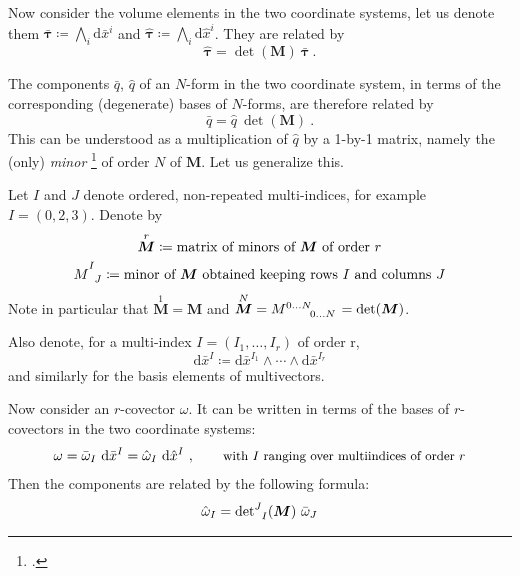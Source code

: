 \documentclass[\ifafour a4paper,12pt,\else a5paper,10pt,\fi%
onecolumn,oneside,article,%
british%
]{memoir}
\theoremstyle{remark}
\theoremstyle{innote}
\newcommand*{\citep}{\footcites}
\newcommand*{\di}{\mathrm{d}}%
\newcommand*{\defd}{\coloneqq}
\renewcommand*{\|}[1][]{\nonscript\:#1\vert\nonscript\:\mathopen{}}
\newcommand*{\sect}{\S}%
\newcommand*{\hx}{\hat{x}}
\newcommand*{\lx}{\bar{x}}
\renewcommand*{\i}{\indices}
\newcommand*{\mino}[2][]{\overset{#1}{#2}}
\begin{document}
Now consider the volume elements in the two coordinate systems, let us
denote them $\bar{\bm{\tau}} \defd \bigwedge_{i} \di \lx^{i}$ and $\hat{\bm{\tau}}
\defd \bigwedge_{i} \di \hx^{i}$. They are related by
\begin{equation}
  \label{eq:base_coord_vol_tr}
  \hat{\bm{\tau}} = \det(\bm{M})\ \bar{\bm{\tau}} \ .
\end{equation}

The components $\bar{q}$, $\hat{q}$ of an $N$-form in the two coordinate system, in
terms of the corresponding (degenerate) bases of $N$-forms, are therefore
related by
\begin{equation}
  \label{eq:comp_vol_tr}
  \bar{q} = \hat{q}\ \det(\bm{M}) \ .
\end{equation}
This can be understood as a multiplication of $\hat{q}$ by a 1-by-1 matrix, namely
the (only) \emph{minor} \citep[\sect~0.7.1]{hornetal1985_r2013} of order
$N$ of $\bm{M}$. Let us generalize this.

\bigskip

Let $I$ and $J$ denote ordered, non-repeated multi-indices, for example
$I= (0,2,3)$. Denote by
\begin{gather}
  \label{eq:minor_det}
  \mino[r]{\bm{M}} \defd
  \text{matrix of minors of $\bm{M}$ of order $r$}
  \\
  \label{eq:comp_minor_det}
 \mino{M}\i{^{I}_{J}} \defd
  \text{minor of $\bm{M}$ obtained keeping rows $I$ and columns $J$}
\end{gather}
Note in particular that $\mino[1]{\bm{M}} = \bm{M}$ and
$\mino[N]{\bm{M}}=M\i{^{0\dotso N}_{0\dotso N}} = \det(\bm{M})$.

Also denote, for a multi-index $I = (I_{1}, \dotsc, I_{r})$ of order r,
\begin{equation}
  \label{eq:bases_cov_multitind}
  \di\lx^{I} \defd \di\lx^{I_{1}} \land \dotsb \land \di\lx^{I_{r}}
\end{equation}
and similarly for the basis elements of multivectors.


\bigskip



Now consider an $r$-covector $\omega$. It can be written in terms of the bases
of $r$-covectors in the two coordinate systems:
\begin{align}
  \label{eq:2omega_bases}
  \omega = \bar{\omega}_{I}\ \di \lx^{I} = \hat{\omega}_{I}\ \di\hx^{I} \ ,
  \qquad\text{\small with $I$ ranging over multiindices of order $r$}
\end{align}
Then the components are related by the following formula:
\begin{equation}
  \label{eq:components_multicov_transf}
  \hat{\omega}_{I} = \det\nolimits\i{^{J}_{I}}(\bm{M})\ \bar{\omega}_{J}
\end{equation}
\end{document}
